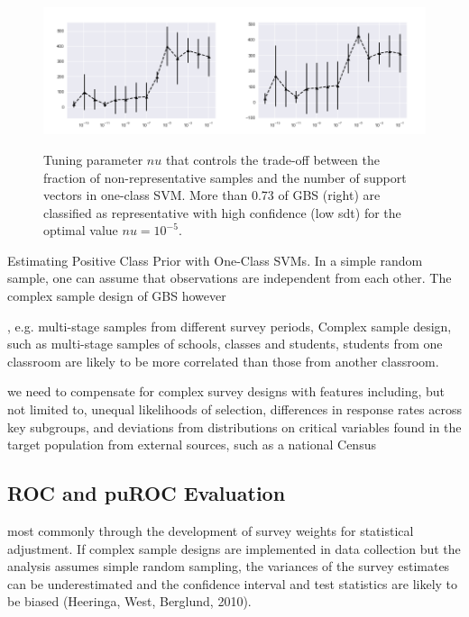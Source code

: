 \begin{figure}[ht]
	\begin{center}
		\includegraphics[scale=0.55,angle=0]{fig/occfigure}
		\label{occ}
		\vspace*{-1.0cm}
		\caption{Tuning parameter \(nu\) that controls the trade-off between the fraction of non-representative samples and the number of support vectors in one-class SVM. More than 0.73 of GBS (right) are classified as representative with high confidence (low sdt) for the optimal value \(nu = 10^{-5}\).}
	\end{center}
\end{figure}

Estimating Positive Class Prior with One-Class SVMs. In a simple random sample, one can assume that observations are independent from each other. The complex sample design of GBS however

, e.g. multi-stage samples from different survey periods,
Complex sample design, such as multi-stage samples of schools, classes and students, students from one classroom are likely to be more correlated than those from another classroom. 

we need to compensate for complex survey designs with features including, but not limited to, unequal likelihoods of selection, differences in response rates across key subgroups, and deviations from distributions on critical variables found in the target population from external sources, such as a national Census

\subsection{ROC and puROC Evaluation}

most commonly through the development of survey weights for statistical adjustment. If complex sample designs are implemented in data collection but the analysis assumes simple random sampling, the variances of the survey estimates can be underestimated and the confidence interval and test statistics are likely to be biased (Heeringa, West,  Berglund, 2010).

